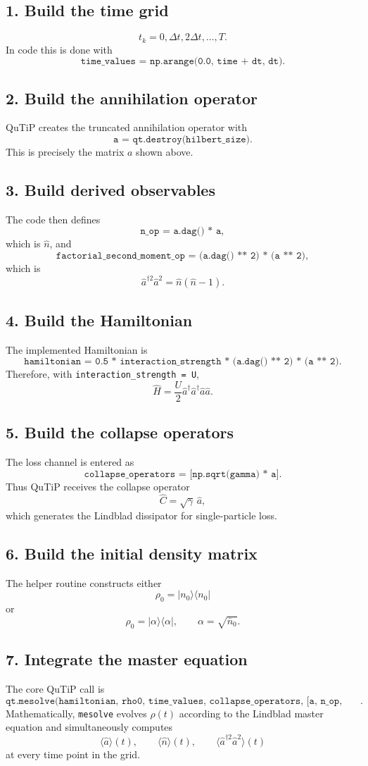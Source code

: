 \documentclass[12pt]{article}
\begin{document}
\subsection*{1. Build the time grid}
\[
t_k = 0,\Delta t,2\Delta t,\dots,T.
\]
In code this is done with
\[
\texttt{time\_values = np.arange(0.0, time + dt, dt)}.
\]

\subsection*{2. Build the annihilation operator}
QuTiP creates the truncated annihilation operator with
\[
\texttt{a = qt.destroy(hilbert\_size)}.
\]
This is precisely the matrix $a$ shown above.

\subsection*{3. Build derived observables}
The code then defines
\[
\texttt{n\_op = a.dag() * a},
\]
which is $\hat n$, and
\[
\texttt{factorial\_second\_moment\_op = (a.dag() ** 2) * (a ** 2)},
\]
which is
\[
\hat a^{\dagger 2}\hat a^2 = \hat n(\hat n-1).
\]

\subsection*{4. Build the Hamiltonian}
The implemented Hamiltonian is
\[
\texttt{hamiltonian = 0.5 * interaction\_strength * (a.dag() ** 2) * (a ** 2)}.
\]
Therefore, with \texttt{interaction\_strength = U},
\[
\hat H = \frac{U}{2}\hat a^\dagger \hat a^\dagger \hat a \hat a.
\]

\subsection*{5. Build the collapse operators}
The loss channel is entered as
\[
\texttt{collapse\_operators = [np.sqrt(gamma) * a]}.
\]
Thus QuTiP receives the collapse operator
\[
\hat C = \sqrt{\gamma}\,\hat a,
\]
which generates the Lindblad dissipator for single-particle loss.

\subsection*{6. Build the initial density matrix}
The helper routine constructs either
\[
\rho_0 = |n_0\rangle\langle n_0|
\]
or
\[
\rho_0 = |\alpha\rangle\langle \alpha|,
\qquad \alpha=\sqrt{\bar n_0}.
\]

\subsection*{7. Integrate the master equation}
The core QuTiP call is
\[
\texttt{qt.mesolve(hamiltonian, rho0, time\_values, collapse\_operators, [a, n\_op, factorial\_second\_moment\_op])}.
\]
Mathematically, \texttt{mesolve} evolves $\rho(t)$ according to the Lindblad master equation and simultaneously computes
\[
\langle \hat a \rangle(t), \qquad
\langle \hat n \rangle(t), \qquad
\langle \hat a^{\dagger 2}\hat a^2 \rangle(t)
\]
at every time point in the grid.
\end{document}
